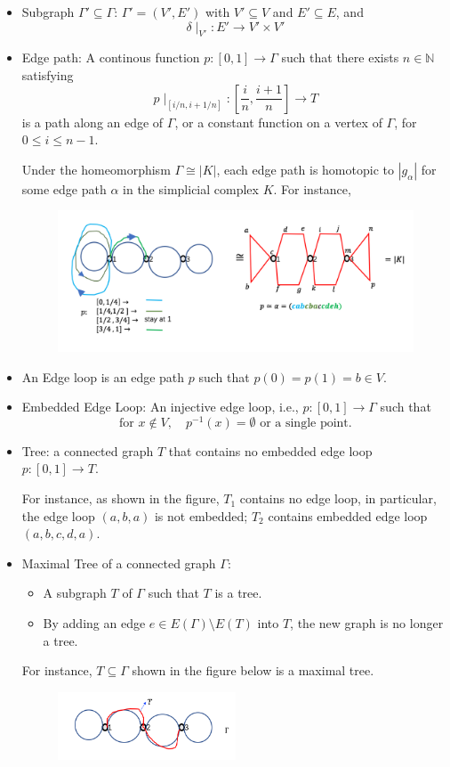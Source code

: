 \begin{definition}
\begin{itemize}
\item
Subgraph $\Gamma'\subseteq\Gamma$:
$\Gamma'=(V',E')$ with $V'\subseteq V$ and $E'\subseteq E$, and
\[
\delta\mid_{V'}:E'\to V'\times V'
\]
\item
Edge path:
A continous function $p:[0,1]\to\Gamma$ such that there exists $n\in\mathbb{N}$ satisfying
\[
p\mid_{[i/n,i+1/n]}:\left[\frac{i}{n},\frac{i+1}{n}\right]\to T
\]
is a path along an edge of $\Gamma$, or a constant function on a vertex of $\Gamma$, for $0\le i\le n-1$.
\begin{remark}
Under the homeomorphism $\Gamma\cong|K|$, each edge path is homotopic to $|g_\alpha|$ for some edge path $\alpha$ in the simplicial complex $K$.
For instance, 
\begin{figure}[H]
\centering
\includegraphics[width=\textwidth]{week14/f_26}
\end{figure}
\end{remark}
\item
An Edge loop is an edge path $p$ such that $p(0)=p(1)=b\in V$.
\item
Embedded Edge Loop: An injective edge loop, i.e., $p:[0,1]\to\Gamma$ such that 
\[
\text{for $x\notin V$},\quad
p^{-1}(x)=\emptyset\text{ or a single point}.
\]
\item
Tree: a connected graph $T$ that contains no embedded edge loop $p:[0,1]\to T$.

For instance, as shown in the figure, $T_1$ contains no edge loop, in particular, the edge loop $(a,b,a)$ is not embedded;
$T_2$ contains embedded edge loop $(a,b,c,d,a)$.
\item
Maximal Tree of a connected graph $\Gamma$:
\begin{itemize}
\item
A subgraph $T$ of $\Gamma$ such that $T$ is a tree.
\item
By adding an edge $e\in E(\Gamma)\setminus E(T)$ into $T$, the new graph is no longer a tree.
\end{itemize}
For instance, $T\subseteq\Gamma$ shown in the figure below is a maximal tree.
\begin{figure}[H]
\centering
\includegraphics[width=0.5\textwidth]{week14/f_28}
\end{figure}
\end{itemize}
\end{definition}


